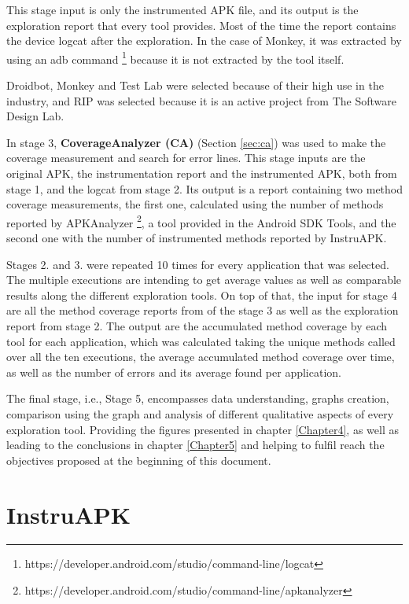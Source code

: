 This stage input is only the instrumented APK file, and its output is the exploration report that every tool provides. Most of the time the report contains the device logcat after the exploration. In the case of Monkey, it was extracted by using an adb command \footnote{https://developer.android.com/studio/command-line/logcat} because it is not extracted by the tool itself.

Droidbot, Monkey and Test Lab were selected because of their high use in the industry, and RIP was selected because it is an active project from The Software Design Lab. 

In stage 3, \textbf{CoverageAnalyzer (CA)} (Section \ref{sec:ca}) was used to make the coverage measurement and search for error lines. This stage inputs are the original APK, the instrumentation report and the instrumented APK, both from stage 1, and the logcat from stage 2. Its output is a report containing two method coverage measurements, the first one, calculated using the number of methods reported by APKAnalyzer \footnote{https://developer.android.com/studio/command-line/apkanalyzer}, a tool provided in the Android SDK Tools, and the second one with the number of instrumented methods reported by InstruAPK.

Stages 2. and 3. were repeated 10 times for every application that was selected. The multiple executions are intending to get average values as well as comparable results along the different exploration tools. On top of that, the input for stage 4 are all the method coverage reports from of the stage 3 as well as the exploration report from stage 2. The output are the accumulated method coverage by each tool for each application, which was calculated taking the unique methods called over all the ten executions, the average accumulated method coverage over time, as well as the number of errors and its average found per application.

The final stage, i.e.,  Stage 5,  encompasses data understanding, graphs creation, comparison using the graph and analysis of different qualitative aspects of every exploration tool. Providing the figures presented in chapter \ref{Chapter4}, as well as leading to the conclusions in chapter \ref{Chapter5} and helping to fulfil reach the objectives proposed at the beginning of this document.

\section{InstruAPK}\label{sec:instruAPK}

